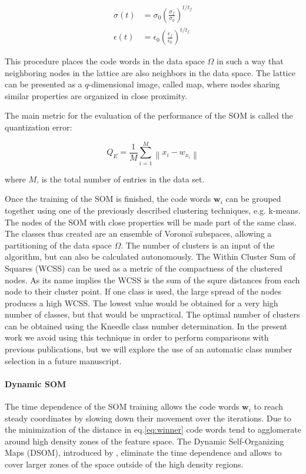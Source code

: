 \begin{align}
\sigma(t) & = \sigma_0 \left(\frac{\sigma_f}{\sigma_0}\right)^{t/t_f} \label{eq:sigma} \\
\epsilon(t) & = \epsilon_0 \left(\frac{\epsilon_f}{\epsilon_0}\right)^{t/t_f} \label{eq:epsilon}
\end{align}

This procedure places the code words in the data space $\Omega$ in such a way that neighboring nodes in the lattice are also neighbors in the data space. The lattice can be presented as a $q$-dimensional image, called map, where nodes sharing similar properties are organized in close proximity.

The main metric for the evaluation of the performance of the SOM is called the quantization error:

\begin{equation}
Q_E = \frac{1}{M} \sum_{i=1}^M \left\lVert x_i - w_{x_i} \right\rVert
\end{equation}

where $M$, is the total number of entries in the data set.

Once the training of the SOM is finished, the code words $\boldsymbol{w}_i$ can be grouped together using one of the previously described clustering techniques, e.g. k-means. The nodes of the SOM with close properties will be made part of the same class. The classes thus created are an ensemble of Vorono\"i subspaces, allowing a partitioning of the data space $\Omega$. The number of clusters is an input of the algorithm, but can also be calculated autonomously. The Within Cluster Sum of Squares (WCSS) can be used as a metric of the compactness of the clustered nodes. As its name implies the WCSS is the sum of the squre distances from each node to their cluster point. If one class is used, the large spread of the nodes produces a high WCSS. The lowest value would be obtained for a very high number of classes, but that would be unpractical. The optimal number of clusters can be obtained using the Kneedle class number determination\citep{Satopaa2011}. In the present work we avoid using this technique in order to perform comparisons with previous publications, but we will explore the use of an automatic class number selection in a future manuscript.

\paragraph{Dynamic SOM}
The time dependence of the SOM training allows the code words $\boldsymbol{w}_i$ to reach steady coordinates by slowing down their movement over the iterations. Due to the minimization of the distance in eq.\eqref{eq:winner} code words tend to agglomerate around high density zones of the feature space. The Dynamic Self-Organizing Maps (DSOM), introduced by \citep{Rougier2011}, eliminate the time dependence and allows to cover larger zones of the space outside of the high density regions.

